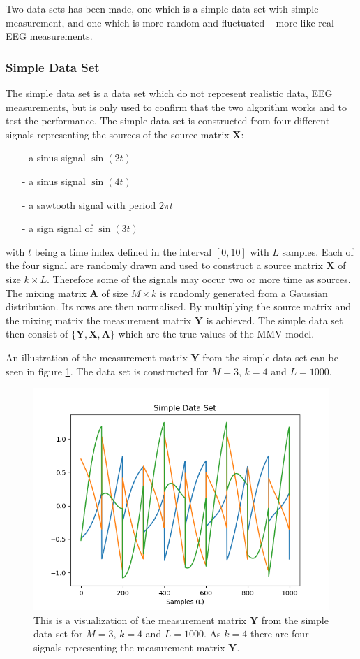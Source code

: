Two data sets has been made, one which is a simple data set with simple measurement, and one which is more random and fluctuated -- more like real EEG measurements.

\subsubsection{Simple Data Set}
The simple data set is a data set which do not represent realistic data, EEG measurements, but is only used to confirm that the two algorithm works and to test the performance.
The simple data set is constructed from four different signals representing the sources of the source matrix $\mathbf{X}$: 
\begin{itemize}
\item[-] a sinus signal $\sin(2t)$
\item[-] a sinus signal $\sin(4t)$
\item[-] a sawtooth signal with period $2 \pi t$
\item[-] a sign signal of $\sin(3t)$
\end{itemize}
with $t$ being a time index defined in the interval $[0,10]$ with $L$ samples. Each of the four signal are randomly drawn and used to construct a source matrix $\mathbf{X}$ of size $k \times L$. Therefore some of the signals may occur two or more time as sources.
The mixing matrix $\mathbf{A}$ of size $M \times k$ is randomly generated from a Gaussian distribution. Its rows are then normalised. 
By multiplying the source matrix and the mixing matrix the measurement matrix $\mathbf{Y}$ is achieved.
The simple data set then consist of $\{ \mathbf{Y}, \mathbf{X}, \mathbf{A} \}$ which are the true values of the MMV model.

An illustration of the measurement matrix $\mathbf{Y}$ from the simple data set can be seen in figure \ref{fig:mix}. The data set is constructed for $M = 3$, $k = 4$ and $L = 1000$.
\begin{figure}[H]
\centering
\includegraphics[scale=0.5]{figures/chapter6/Mix_Data_m3_n4_k4_L1000.png}
\caption{This is a visualization of the measurement matrix $\mathbf{Y}$ from the simple data set for $M = 3$, $k=4$ and $L=1000$. As $k = 4$ there are four signals representing the measurement matrix $\mathbf{Y}$.}
\label{fig:mix}
\end{figure}
\noindent

